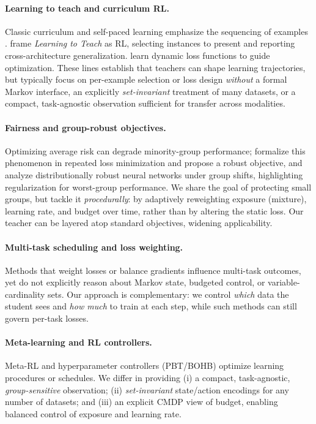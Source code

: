 \documentclass[11pt]{article}
\newcommand{\1}{\mathbf{1}}
\begin{document}
\paragraph{Learning to teach and curriculum RL.}
Classic curriculum and self-paced learning emphasize the sequencing of examples \citep{bengio2009curriculum,kumar2010selfpaced}. \citet{fan2018l2t} frame \emph{Learning to Teach} as RL, selecting instances to present and reporting cross-architecture generalization. \citet{wu2018l2tloss} learn dynamic loss functions to guide optimization. These lines establish that teachers can shape learning trajectories, but typically focus on per-example selection or loss design \emph{without} a formal Markov interface, an explicitly \emph{set-invariant} treatment of many datasets, or a compact, task-agnostic observation sufficient for transfer across modalities.

\paragraph{Fairness and group-robust objectives.}
Optimizing average risk can degrade minority-group performance; \citet{hashimoto2018fairness} formalize this phenomenon in repeated loss minimization and propose a robust objective, and \citet{sagawa2020dro} analyze distributionally robust neural networks under group shifts, highlighting regularization for worst-group performance. We share the goal of protecting small groups, but tackle it \emph{procedurally}: by adaptively reweighting exposure (mixture), learning rate, and budget over time, rather than by altering the static loss. Our teacher can be layered atop standard objectives, widening applicability.

\paragraph{Multi-task scheduling and loss weighting.}
Methods that weight losses or balance gradients \citep{kendall2018uncertainty,chen2018gradnorm} influence multi-task outcomes, yet do not explicitly reason about Markov state, budgeted control, or variable-cardinality sets. Our approach is complementary: we control \emph{which} data the student sees and \emph{how much} to train at each step, while such methods can still govern per-task losses.

\paragraph{Meta-learning and RL controllers.}
Meta-RL \citep{duan2016rl2,finn2017maml} and hyperparameter controllers (PBT/BOHB) \citep{jaderberg2017pbt,falkner2018bohb,snoek2012practical} optimize learning procedures or schedules. We differ in providing (i) a compact, task-agnostic, \emph{group-sensitive} observation; (ii) \emph{set-invariant} state/action encodings for any number of datasets; and (iii) an explicit CMDP view of budget, enabling balanced control of exposure and learning rate.
\end{document}

